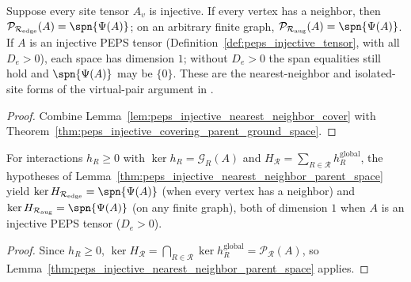 \begin{lemma}%
    \label{thm:peps_injective_nearest_neighbor_parent_space}
    \leanok
    Suppose every site tensor $A_v$ is injective. If every vertex has a
    neighbor, then $\mathcal P_{\mathcal R_{\mathrm{edge}}}(A)=\spn\{\Psi(A)\}$;
    on an arbitrary finite graph,
    $\mathcal P_{\mathcal R_{\mathrm{aug}}}(A)=\spn\{\Psi(A)\}$.
    If $A$ is an injective PEPS tensor (Definition~\ref{def:peps_injective_tensor},
    with all $D_e>0$), each space has dimension $1$; without $D_e>0$ the span
    equalities still hold and $\spn\{\Psi(A)\}$ may be $\{0\}$.
    These are the nearest-neighbor and isolated-site forms of the
    virtual-pair argument in
    \cite[Section~IV.C.1]{Cirac2021Matrix}.
\end{lemma}

\begin{proof}\leanok
    Combine Lemma~\ref{lem:peps_injective_nearest_neighbor_cover} with
    Theorem~\ref{thm:peps_injective_covering_parent_ground_space}.
\end{proof}

\begin{corollary}%
    \label{cor:peps_injective_nearest_neighbor_parent_kernel}
    \leanok
    For interactions $h_R\ge 0$ with $\ker h_R=\mathcal G_R(A)$ and
    $H_{\mathcal R}=\sum_{R\in\mathcal R}h_R^{\mathrm{global}}$, the hypotheses
    of Lemma~\ref{thm:peps_injective_nearest_neighbor_parent_space} yield
    $\ker H_{\mathcal R_{\mathrm{edge}}}=\spn\{\Psi(A)\}$ (when every vertex
    has a neighbor) and $\ker H_{\mathcal R_{\mathrm{aug}}}=\spn\{\Psi(A)\}$
    (on any finite graph), both of dimension $1$ when $A$ is an injective PEPS
    tensor ($D_e>0$).
\end{corollary}

\begin{proof}\leanok
    Since $h_R\ge 0$, $\ker H_{\mathcal R}=\bigcap_{R\in\mathcal R}\ker h_R^{\mathrm{global}}=\mathcal P_{\mathcal R}(A)$,
    so Lemma~\ref{thm:peps_injective_nearest_neighbor_parent_space} applies.
\end{proof}
